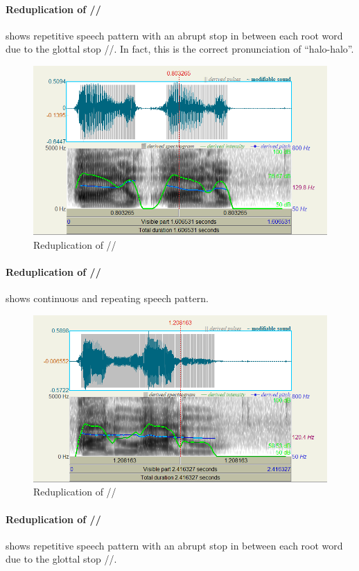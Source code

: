 \documentclass{article}
\begin{document}
	\paragraph{Reduplication of //}  shows repetitive speech pattern with
	an abrupt stop in between each root word due to the glottal stop //. In fact, this is the
	correct pronunciation of ``halo-halo''.
	
	\begin{figure}
		\centering
		\includegraphics[width=0.65\linewidth]{img/hal_o.png}
		\caption{Reduplication of //}\label{fig:hal'o}
	\end{figure}
	
	\paragraph{Reduplication of //}  shows continuous and repeating
	speech pattern.
	
	\begin{figure}
		\centering
		\includegraphics[width=0.65\linewidth]{img/halu.png}
		\caption{Reduplication of //}\label{fig:halu}
	\end{figure}
	
	\paragraph{Reduplication of //}  shows repetitive speech pattern with
	an abrupt stop in between each root word due to the glottal stop //.
	
\end{document}
